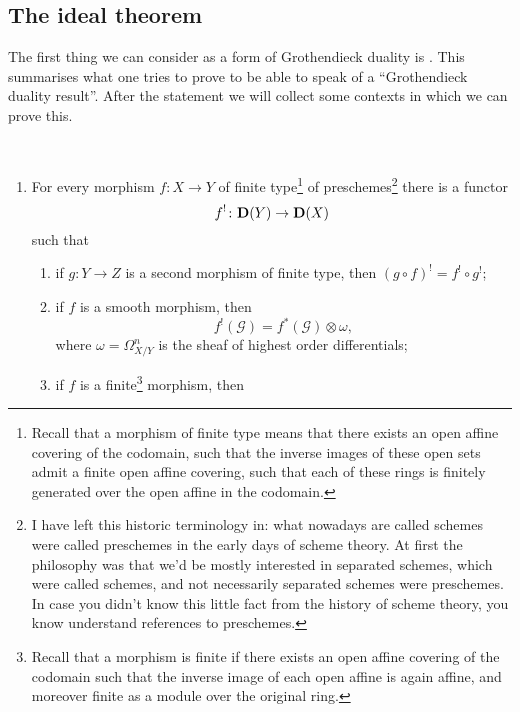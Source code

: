 \documentclass[10pt,a4paper]{article}
\begin{document}
\subsection{The ideal theorem}
The first thing we can consider as a form of Grothendieck duality is \cite[Ideal theorem on page 6]{hartshorne-residues-and-duality}. This summarises what one tries to prove to be able to speak of a ``Grothendieck duality result''. After the statement we will collect some contexts in which we can prove this.
\begin{theorem} {\ }
  \label{theorem:classical}
  \begin{enumerate}
    \item\label{enumerate:classical-a} For every morphism $f\colon X\to Y$ of finite type\footnote{Recall that a morphism of finite type means that there exists an open affine covering of the codomain, such that the inverse images of these open sets admit a finite open affine covering, such that each of these rings is finitely generated over the open affine in the codomain.} of preschemes\footnote{I have left this historic terminology in: what nowadays are called schemes were called preschemes in the early days of scheme theory. At first the philosophy was that we'd be mostly interested in separated schemes, which were called schemes, and not necessarily separated schemes were preschemes. In case you didn't know this little fact from the history of scheme theory, you know understand references to preschemes.} there is a functor
      \begin{equation}
        \label{equation:f-upper-shriek}
        f^!\colon\mathbf{D}(Y)\to\mathbf{D}(X)
      \end{equation}
      such that
      \begin{enumerate}
        \item\label{enumerate:classical-a-1} if $g\colon Y\to Z$ is a second morphism of finite type, then $(g\circ f)^!=f^!\circ g^!$;
        \item\label{enumerate:classical-a-2} if $f$ is a smooth morphism, then
          \begin{equation}
            f^!(\mathcal{G})=f^*(\mathcal{G})\otimes\omega,
          \end{equation}
          where $\omega=\Omega_{X/Y}^n$ is the sheaf of highest order differentials;
        \item\label{enumerate:classical-a-3} if $f$ is a finite\footnote{Recall that a morphism is finite if there exists an open affine covering of the codomain such that the inverse image of each open affine is again affine, and moreover finite as a module over the original ring.} morphism, then

\end{enumerate}
\end{enumerate}
\end{theorem}
\end{document}
